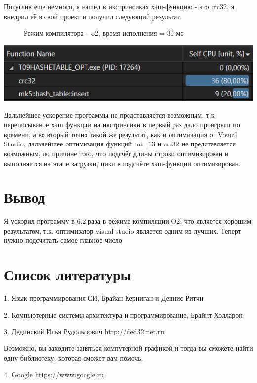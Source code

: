 \documentclass[a4paper,12pt]{article}
\begin{document}
Погуглив еще немного, я нашел в икстринсиках хэш-функцию - это crc32, я внедрил её в свой проект и получил следующий результат.

\begin{center}
	\begin{figure}[h]
		\caption{Режим компилятора -- o2, время исполнения = 30 мс}
	\end{figure}
	\includegraphics[scale = 1]{4_test.png}
\end{center}


Дальнейшее ускорение программы не представляется возможным, т.к. переписывание хэш функции на икстринсики в первый раз дало проигрыш по времени, а во вторый точно такой же результат, как и оптимизация от Visual Studio, дальнейшее оптимизация функций rot\_13 и crc32 не представляется возможным, по причине того, что подсчёт длины строки оптимизирован и выполняется на этапе загрузки, цикл в подсчёте хэш-функции оптимизирован.

\section*{Вывод}
Я ускорил программу в 6.2 раза в режиме компиляции O2, что является хорошим результатом, т.к. оптимизатор visual studio является одним из лучших.
Теперт нужно подсчитать самое главное число

\section*{Список литературы}
1. Язык программирования СИ, Брайан Керниган и Деннис Ритчи

2. Компьютерные системы архитектура и программирование, Брайнт-Холларон

3. \href{http://ded32.net.ru}{Дединский Илья Рудольфович http://ded32.net.ru}

Возможно, вы заходите заняться компутерной графикой и тогда вы сможете найти одну библиотеку, которая сможет вам помочь.

4. \href{https://www.google.ru}{Google https://www.google.ru }
\end{document}
